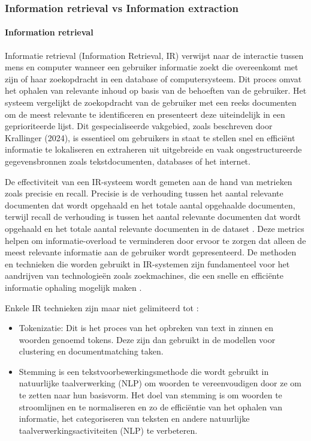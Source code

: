 \subsubsection{Information retrieval vs Information extraction}
\paragraph{Information retrieval}
Informatie retrieval (Information Retrieval, IR) verwijst naar de interactie tussen mens en computer wanneer een gebruiker informatie zoekt die overeenkomt met zijn of haar zoekopdracht in een database of computersysteem. Dit proces omvat het ophalen van relevante inhoud op basis van de behoeften van de gebruiker. Het systeem vergelijkt de zoekopdracht van de gebruiker met een reeks documenten om de meest relevante te identificeren en presenteert deze uiteindelijk in een geprioriteerde lijst. Dit gespecialiseerde vakgebied, zoals beschreven door Krallinger (2024), is essentieel om gebruikers in staat te stellen snel en efficiënt informatie te lokaliseren en extraheren uit uitgebreide en vaak ongestructureerde gegevensbronnen zoals tekstdocumenten, databases of het internet.

De effectiviteit van een IR-systeem wordt gemeten aan de hand van metrieken zoals precisie en recall. Precisie is de verhouding tussen het aantal relevante documenten dat wordt opgehaald en het totale aantal opgehaalde documenten, terwijl recall de verhouding is tussen het aantal relevante documenten dat wordt opgehaald en het totale aantal relevante documenten in de dataset \autocite{Javija2024}. Deze metrics helpen om informatie-overload te verminderen door ervoor te zorgen dat alleen de meest relevante informatie aan de gebruiker wordt gepresenteerd. De methoden en technieken die worden gebruikt in IR-systemen zijn fundamenteel voor het aandrijven van technologieën zoals zoekmachines, die een snelle en efficiënte informatie ophaling mogelijk maken \autocite{Krallinger2024}.

Enkele IR technieken zijn maar niet gelimiteerd tot \autocite{IBM2024}:
\begin{itemize}
  \item Tokenizatie: Dit is het proces van het opbreken van text in zinnen en woorden genoemd tokens. Deze zijn dan gebruikt in de modellen voor clustering en documentmatching taken\autocite{IBM2024}.
  \item Stemming is een tekstvoorbewerkingsmethode die wordt gebruikt in natuurlijke taalverwerking (NLP) om woorden te vereenvoudigen door ze om te zetten naar hun basisvorm. Het doel van stemming is om woorden te stroomlijnen en te normaliseren en zo de efficiëntie van het ophalen van informatie, het categoriseren van teksten en andere natuurlijke taalverwerkingsactiviteiten (NLP) te verbeteren\autocite{SC2024}.
\end{itemize}

